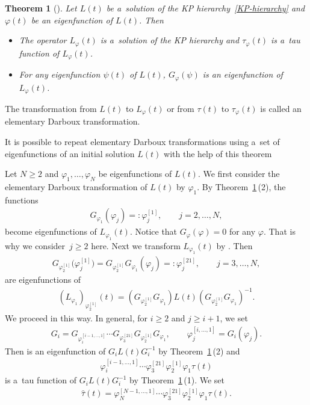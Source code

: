 \documentclass[10pt,a4paper]{amsart}
\numberwithin{equation}{section}
\newtheorem{Theorem}{Theorem}[section]
\theoremstyle{definition}
\begin{document}
\begin{Theorem}[\cite{H-van-de-Leur2001,
Kac-van-de-Leur2018,Kakei,Ovel1993}]\label{Darboux-property}
Let $L(t)$ be a~solution of the KP hierarchy~\eqref{KP-hierarchy} and $\varphi(t)$ be an eigenfunction of $L(t)$.
Then
\begin{itemize}\itemsep=0pt
\item[$(1)$] The operator $L_\varphi(t)$ is a~solution of the KP hierarchy and $\tau_\varphi(t)$ is a~tau function of $L_\varphi(t)$.

\item[$(2)$] For any eigenfunction $\psi(t)$ of $L(t)$, $G_\varphi(\psi)$ is an eigenfunction of $L_\varphi(t)$.
\end{itemize}
\end{Theorem}

The transformation from $L(t)$ to $L_\varphi(t)$ or from $\tau(t)$ to $\tau_\varphi(t)$ is called an elementary Darboux transformation.

It is possible to repeat elementary Darboux transformations
using a~set of eigenfunctions of an initial solution $L(t)$ with the help of
this theorem

Let $N\geq 2$ and $\varphi_1,\dots , \varphi_N$ be eigenfunctions of $L(t)$.
We first consider the elementary Darboux transformation of $L(t)$ by
$\varphi_1$. By Theorem~\ref{Darboux-property}\,(2),
the functions
\begin{gather*}
G_{\varphi_1}(\varphi_j)=:\varphi^{[1]}_j,
\qquad
j=2,\dots ,N,
\end{gather*}
become eigenfunctions of $L_{\varphi_1}(t)$.
Notice that $G_\varphi(\varphi)=0$ for any $\varphi$. That is why
we consider~${j\geq 2}$ here.
Next we transform $L_{\varphi_1}(t)$ by . Then
\begin{gather*}
G_{\varphi^{[1]}_2}\bigl(\varphi^{[1]}_j\bigr)=G_{\varphi^{[1]}_2}G_{\varphi_1}(\varphi_j)=:
\varphi^{[21]}_j,
\qquad
j=3,\dots ,N,
\end{gather*}
are eigenfunctions of
\begin{gather*}
(L_{\varphi_1})_{\varphi^{[1]}_2}(t)
=(G_{\varphi^{[1]}_2}G_{\varphi_1})L(t)(G_{\varphi^{[1]}_2}G_{\varphi_1})^{-1}.
\end{gather*}
We proceed in this way.
In general, for $i\geq 2$ and $j\geq i+1$, we set
\begin{gather*}
G_{i}=G_{\varphi_i^{[i-1,\dots ,1]}}\cdots G_{\varphi_3^{[21]}}
G_{\varphi_2^{[1]}}G_{\varphi_1},
\qquad
\varphi_j^{[i,\dots ,1]}= G_i(\varphi_j).
\end{gather*}
Then  is an eigenfunction of $G_{i}L(t)G_{i}^{-1}$ by
 Theorem~\ref{Darboux-property}\,(2) and
\begin{gather*}
\varphi_i^{[i-1,\dots ,1]}\cdots \varphi_3^{[21]}\varphi_2^{[1]}\varphi_1\tau(t)
\end{gather*}
is a~tau function of $G_{i}L(t)G_{i}^{-1}$ by Theorem~\ref{Darboux-property}\,(1).
We set
\begin{gather}
\widehat{\tau}(t)=
\varphi_N^{[N-1,\dots ,1]}\cdots \varphi_3^{[21]}\varphi_2^{[1]}\varphi_1\tau(t).
\label{tau-hat}
\end{gather}
\end{document}
